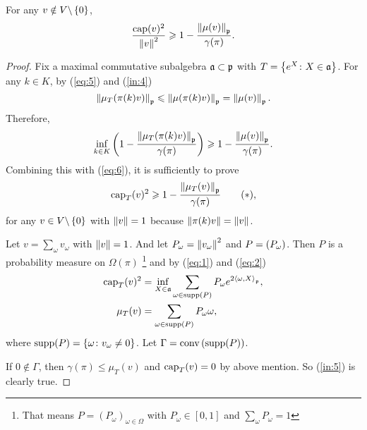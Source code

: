 \documentclass[suri,pdfbookmark]{engsuribt} %
\begin{document}
  \begin{thm}\label{thm:4}
    For any $v \notin V \backslash \left\{0\right\}$,
    \begin{equation*}
      \frac{\operatorname{cap}(v)^2}{\left\lVert v\right\lVert^2} \geqslant 1 - \frac{\left\lVert\mu(v)\right\lVert_{\mathfrak{p}}}{\gamma(\pi)}.
    \end{equation*}
  \end{thm}
  \begin{proof}
    Fix a maximal commutative subalgebra $\mathfrak{a} \subset \mathfrak{p}$ with $T = \left\{e^X \colon X \in \mathfrak{a}\right\}$. For any $k \in K$, by (\ref{eq:5}) and (\ref{in:4})
    \begin{equation*}
      \left\lVert\mu_T(\pi(k)v)\right\lVert_{\mathfrak{p}} \leqslant \left\lVert\mu(\pi(k)v)\right\lVert_{\mathfrak{p}} = \left\lVert\mu(v)\right\lVert_{\mathfrak{p}}.
    \end{equation*}
    Therefore,
    \begin{equation*}
      \inf_{k \in K}\left(1-\frac{\left\lVert\mu_T(\pi(k)v)\right\lVert_{\mathfrak{p}}}{\gamma(\pi)}\right) \geqslant 1-\frac{\left\lVert\mu(v)\right\lVert_{\mathfrak{p}}}{\gamma(\pi)}.
    \end{equation*}
    Combining this with (\ref{eq:6}), it is sufficiently to prove
    \begin{equation*}\label{in:5}
      \operatorname{cap}_T(v)^2\geqslant 1-\frac{\left\lVert\mu_T(v)\right\lVert_{\mathfrak{p}}}{\gamma(\pi)} \tag{$*$},
    \end{equation*}
    for any $v \in V \backslash \left\{0\right\}$ with $\left\lVert v\right\lVert =1$ because $\left\lVert\pi(k)v\right\lVert = \left\lVert v\right\lVert$.
    
    Let $v = \sum_{\omega}v_{\omega}$ with $\left\lVert v\right\lVert = 1$. And let $P_{\omega} = \left\lVert v_{\omega}\right\lVert^2$ and $P = \left(P_{\omega}\right)$. Then $P$ is a probability measure on $\Omega(\pi)$ \footnote{That means $P = (P_{\omega})_{\omega\in\Omega}$ with $P_{\omega} \in [0,1]$ and $\sum_{\omega}P_{\omega}=1$} and by (\ref{eq:1}) and (\ref{eq:2})
    \begin{equation*}
      \begin{split}
        \operatorname{cap}_T(v)^2 &= \inf_{X \in \mathfrak{a}} \sum_{\omega \in \operatorname{supp} (P)} P_{\omega}e^{2\left\langle \omega,X \right\rangle_{\mathfrak{p}}}, \\
        \mu_T(v) &= \sum_{\omega \in \operatorname{supp} (P)} P_{\omega} \omega,
      \end{split}
    \end{equation*}
    where $\operatorname{supp} (P) = \left\{\omega \colon v_{\omega} \neq 0\right\}$. Let $\Gamma = \operatorname{conv}\left(\operatorname{supp} (P)\right)$. 

    If $0 \notin \Gamma$, then $\gamma(\pi) \leqslant \mu_T(v)$ and $\operatorname{cap}_T(v)=0$ by above mention. So (\ref{in:5}) is clearly true. 


\end{proof}
\end{document}

